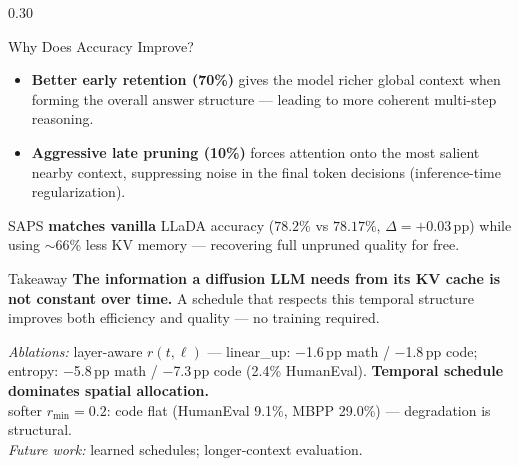 \documentclass[final]{beamer}
\begin{document}
\begin{frame}[t]{}
\begin{columns}[t,totalwidth=\linewidth]
\begin{column}{0.30\linewidth}
  \vspace{0.8em}

  \begin{block}{Why Does Accuracy Improve?}
    \begin{itemize}
      \item \textbf{Better early retention (70\%)} gives the model
            richer global context when forming the overall answer
            structure — leading to more coherent multi-step reasoning.

      \item \textbf{Aggressive late pruning (10\%)} forces attention
            onto the most salient nearby context, suppressing noise
            in the final token decisions (inference-time regularization).
    \end{itemize}

    \vspace{0.3em}
    SAPS \textbf{matches vanilla} LLaDA accuracy ($78.2\%$ vs $78.17\%$,
    $\Delta{=}{+}0.03$\,pp) while using $\sim$66\% less KV memory —
    recovering full unpruned quality for free.
  \end{block}

  \vspace{0.8em}

  \begin{block}{Takeaway}
    \textbf{The information a diffusion LLM needs from its KV cache is
    not constant over time.} A schedule that respects this temporal
    structure improves both efficiency and quality — no training required.

    \vspace{0.4em}
    \textit{Ablations:} layer-aware $r(t,\ell)$ — linear\_up: $-$1.6\,pp math / $-$1.8\,pp code;
    entropy: $-$5.8\,pp math / $-$7.3\,pp code (2.4\% HumanEval).
    \textbf{Temporal schedule dominates spatial allocation.}\\[0.2em]
    softer $r_{\min}{=}0.2$: code flat (HumanEval 9.1\%, MBPP 29.0\%) — degradation is structural.\\[0.2em]
    \textit{Future work:} learned schedules; longer-context evaluation.
  \end{block}

\end{column}

\end{columns}

\end{frame}
\end{document}
